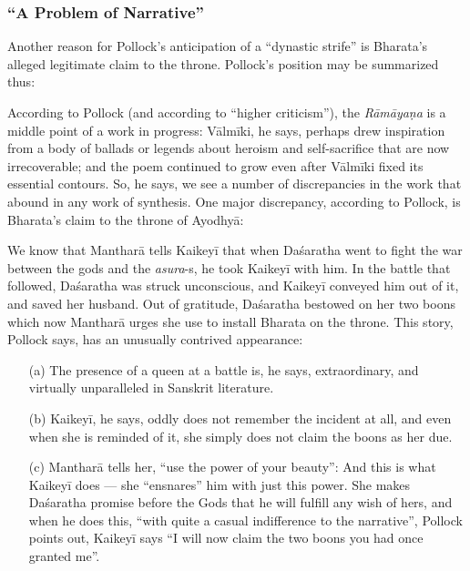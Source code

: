\subsubsection{“A Problem of Narrative”}\label{sec1.2.3.2}

Another reason for Pollock’s anticipation of a “dynastic strife” is Bharata’s alleged legitimate claim to the throne. Pollock’s position may be summarized thus: 

According to Pollock (and according to “higher criticism”), the {\sl Rāmāyaṇa} is a middle point of a work in progress: Vālmīki, he says, perhaps drew inspiration from a body of ballads or legends about heroism and self-sacrifice that are now irrecoverable; and the poem continued to grow even after Vālmīki fixed its essential contours. So, he says, we see a number of discrepancies in the work that abound in any work of synthesis. One major discrepancy, according to Pollock, is Bharata’s claim to the throne of Ayodhyā: 

We know that Mantharā tells Kaikeyī that when Daśaratha went to fight the war between the gods and the {\sl asura}-s, he took Kaikeyī with him. In the battle that followed, Daśaratha was struck unconscious, and Kaikeyī conveyed him out of it, and saved her husband. Out of gratitude, Daśaratha bestowed on her two boons which now Mantharā urges she use to install Bharata on the throne. This story, Pollock says, has an unusually contrived appearance:
\begin{itemize} 
\item[(a)] The presence of a queen at a battle is, he says, extraordinary, and virtually unparalleled in Sanskrit literature.  

\item[(b)] Kaikeyī, he says, oddly does not remember the incident at all, and even when she is reminded of it, she simply does not claim the boons as her due. 

\item[(c)] Mantharā tells her, “use the power of your beauty”: And this is what Kaikeyī does --- she “ensnares” him with just this power. She makes Daśaratha promise before the Gods that he will fulfill any wish of hers, and when he does this, “with quite a casual indifference to the narrative”, Pollock points out, Kaikeyī says “I will now claim the two boons you had once granted me”. 
\end{itemize}

